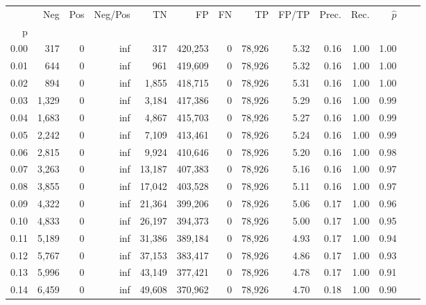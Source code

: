 \begin{tabular}{rrrrrrrrrrrrrr}
\toprule
{} &    Neg &    Pos &  Neg/Pos &       TN &       FP &      FN &      TP & FP/TP & Prec. &  Rec. & $\hat{p}$ \\
p    &        &        &          &          &          &         &         &       &       &       &           \\
\midrule
0.00 &    317 &      0 &      inf &      317 &  420,253 &       0 &  78,926 &  5.32 &  0.16 &  1.00 &      1.00 \\
0.01 &    644 &      0 &      inf &      961 &  419,609 &       0 &  78,926 &  5.32 &  0.16 &  1.00 &      1.00 \\
0.02 &    894 &      0 &      inf &    1,855 &  418,715 &       0 &  78,926 &  5.31 &  0.16 &  1.00 &      1.00 \\
0.03 &  1,329 &      0 &      inf &    3,184 &  417,386 &       0 &  78,926 &  5.29 &  0.16 &  1.00 &      0.99 \\
0.04 &  1,683 &      0 &      inf &    4,867 &  415,703 &       0 &  78,926 &  5.27 &  0.16 &  1.00 &      0.99 \\
0.05 &  2,242 &      0 &      inf &    7,109 &  413,461 &       0 &  78,926 &  5.24 &  0.16 &  1.00 &      0.99 \\
0.06 &  2,815 &      0 &      inf &    9,924 &  410,646 &       0 &  78,926 &  5.20 &  0.16 &  1.00 &      0.98 \\
0.07 &  3,263 &      0 &      inf &   13,187 &  407,383 &       0 &  78,926 &  5.16 &  0.16 &  1.00 &      0.97 \\
0.08 &  3,855 &      0 &      inf &   17,042 &  403,528 &       0 &  78,926 &  5.11 &  0.16 &  1.00 &      0.97 \\
0.09 &  4,322 &      0 &      inf &   21,364 &  399,206 &       0 &  78,926 &  5.06 &  0.17 &  1.00 &      0.96 \\
0.10 &  4,833 &      0 &      inf &   26,197 &  394,373 &       0 &  78,926 &  5.00 &  0.17 &  1.00 &      0.95 \\
0.11 &  5,189 &      0 &      inf &   31,386 &  389,184 &       0 &  78,926 &  4.93 &  0.17 &  1.00 &      0.94 \\
0.12 &  5,767 &      0 &      inf &   37,153 &  383,417 &       0 &  78,926 &  4.86 &  0.17 &  1.00 &      0.93 \\
0.13 &  5,996 &      0 &      inf &   43,149 &  377,421 &       0 &  78,926 &  4.78 &  0.17 &  1.00 &      0.91 \\
0.14 &  6,459 &      0 &      inf &   49,608 &  370,962 &       0 &  78,926 &  4.70 &  0.18 &  1.00 &      0.90 \\

\end{tabular}

